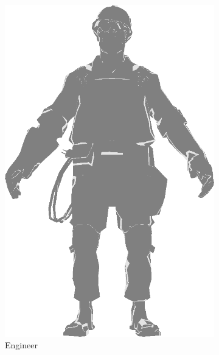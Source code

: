 \begin{figure}[h]
\centering
\begin{subfigure}[b]{0.2\textwidth}
    \includegraphics[width=\textwidth]{img/Lighting/Rim.png}
    \caption{Engineer}
    \label{fig:Rim}
\end{subfigure}
~
\hspace{36pt}
~
\begin{subfigure}[b]{0.22\textwidth}

\end{subfigure}
\end{figure}

